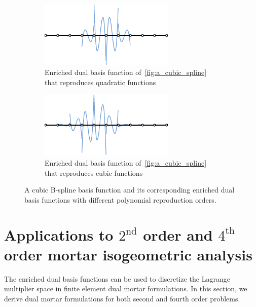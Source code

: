 \begin{figure}[ht]
\begin{subfigure}[t]{.45\linewidth}
	\end{subfigure}\\
	\begin{subfigure}[t]{.45\linewidth}
		\center
		\includegraphics[width=.9\columnwidth]{p=3_c=2}
		\caption{Enriched \Bezier dual basis function of~\ref{fig:a_cubic_spline} that reproduces quadratic functions}
	\end{subfigure}\hfil
	\begin{subfigure}[t]{.45\linewidth}
		\center
		\includegraphics[width=.9\columnwidth]{p=3_c=3}
		\caption{Enriched \Bezier dual basis function of~\ref{fig:a_cubic_spline} that reproduces cubic functions}
	\end{subfigure}
	\caption{A cubic B-spline basis function and its corresponding enriched \Bezier dual basis functions with different polynomial reproduction orders. }\label{fig:enriched_basis_functions}
\end{figure}

\FloatBarrier

\section{Applications to $2^\text{nd}$ order and $4^\text{th}$ order mortar isogeometric analysis}\label{sec:dual_mortar}

The enriched dual basis functions can be used to discretize the Lagrange multiplier space in finite element dual mortar formulations. In this section, we derive dual mortar formulations for both second and fourth order problems.

